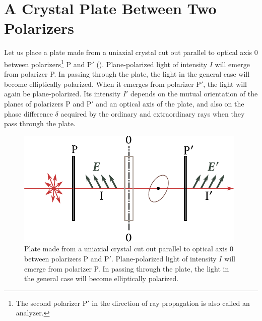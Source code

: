 \section{A Crystal Plate Between Two Polarizers}\label{sec:19_6}

Let us place a plate made from a uniaxial crystal cut out parallel to optical axis $0$ between polarizers\footnote{The second polarizer P$'$ in the direction of ray propagation is also called
an analyzer.} P and P$'$ ().
Plane-polarized light of intensity $I$ will emerge from polarizer P.
In passing through the plate, the light in the general case will become elliptically polarized.
When it emerges from polarizer P$'$, the light will again be plane-polarized.
Its intensity $I'$ depends on the mutual orientation of the planes of polarizers P and P$'$ and an optical axis of the plate, and also on the phase difference $\delta$ acquired by the ordinary and extraordinary rays when they pass through the plate.

\begin{figure}[t]
	\begin{center}
		\includegraphics[scale=1]{figures/ch_19/fig_19_16.pdf}
        \caption[]{Plate made from a uniaxial crystal cut out parallel to optical axis $0$ between polarizers P and P$'$. Plane-polarized light of intensity $I$ will emerge from polarizer P. In passing through the plate, the light in the general case will become elliptically polarized.}
		\label{fig:19_16}
	\end{center}
	\vspace{-0.8cm}
\end{figure}

